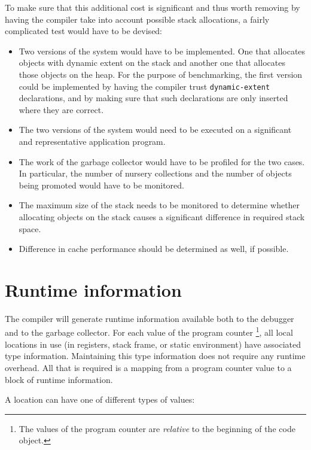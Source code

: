 To make sure that this additional cost is significant and thus worth
removing by having the compiler take into account possible stack
allocations, a fairly complicated test would have to be devised:

\begin{itemize}
\item Two versions of the system would have to be implemented.  One
  that allocates objects with dynamic extent on the stack and another
  one that allocates those objects on the heap.  For the purpose of
  benchmarking, the first version could be implemented by having the
  compiler trust \texttt{dynamic-extent} declarations, and by making
  sure that such declarations are only inserted where they are
  correct.
\item The two versions of the system would need to be executed on a
  significant and representative application program.
\item The work of the garbage collector would have to be profiled for
  the two cases.  In particular, the number of nursery collections and
  the number of objects being promoted would have to be monitored.
\item The maximum size of the stack needs to be monitored to determine
  whether allocating objects on the stack causes a significant
  difference in required stack space.
\item Difference in cache performance should be determined as well, if
  possible.
\end{itemize}

\section{Runtime information}

The compiler will generate runtime information available both to the
debugger and to the garbage collector.  For each value of the program
counter%
\footnote{The values of the program counter are \emph{relative} to the
  beginning of the code object.}, all local locations in use (in
registers, stack frame, or static environment) have associated type
information.  Maintaining this type information does not require any
runtime overhead.  All that is required is a mapping from a program
counter value to a block of runtime information.

A location can have one of different types of values:

